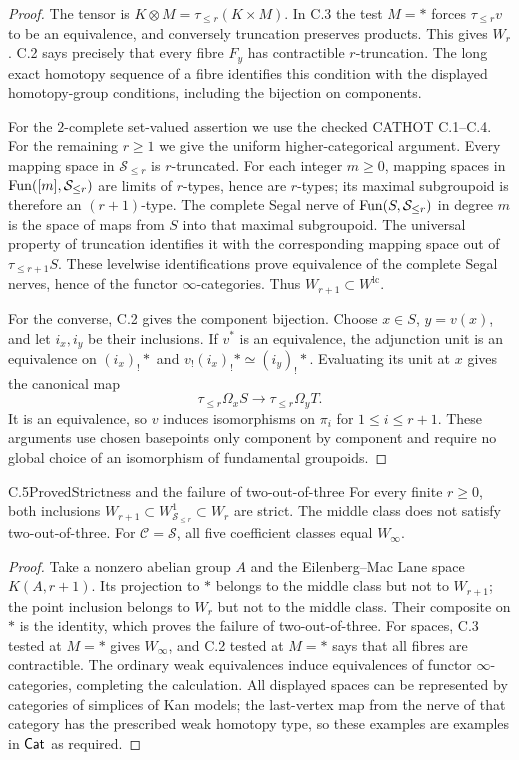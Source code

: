 \begin{proof}
The tensor is $K\otimes M=\tau_{\leq r}(K\times M)$.  In C.3 the test $M=*$ forces $\tau_{\leq r}v$ to be an equivalence, and conversely truncation preserves products.  This gives $W_r$.  C.2 says precisely that every fibre $F_y$ has contractible $r$-truncation.  The long exact homotopy sequence of a fibre identifies this condition with the displayed homotopy-group conditions, including the bijection on components.

For the $2$-complete set-valued assertion we use the checked CATHOT C.1--C.4.  For the remaining $r\geq1$ we give the uniform higher-categorical argument.  Every mapping space in $\mathcal S_{\leq r}$ is $r$-truncated.  For each integer $m\geq0$, mapping spaces in $\operatorname{Fun}([m],\mathcal S_{\leq r})$ are limits of $r$-types, hence are $r$-types; its maximal subgroupoid is therefore an $(r+1)$-type.  The complete Segal nerve of $\operatorname{Fun}(S,\mathcal S_{\leq r})$ in degree $m$ is the space of maps from $S$ into that maximal subgroupoid.  The universal property of truncation identifies it with the corresponding mapping space out of $\tau_{\leq r+1}S$.  These levelwise identifications prove equivalence of the complete Segal nerves, hence of the functor $\infty$-categories.  Thus $W_{r+1}\subset W^{\mathrm{lc}}$.

For the converse, C.2 gives the component bijection.  Choose $x\in S$, $y=v(x)$, and let $i_x,i_y$ be their inclusions.  If $v^*$ is an equivalence, the adjunction unit is an equivalence on $(i_x)_!*$ and $v_!(i_x)_!*\simeq(i_y)_!*$.  Evaluating its unit at $x$ gives the canonical map
\[
 \tau_{\leq r}\Omega_xS\longrightarrow\tau_{\leq r}\Omega_yT.
\]
It is an equivalence, so $v$ induces isomorphisms on $\pi_i$ for $1\leq i\leq r+1$.  These arguments use chosen basepoints only component by component and require no global choice of an isomorphism of fundamental groupoids.
\end{proof}

\begin{claim}{C.5}{Proved}{Strictness and the failure of two-out-of-three}
For every finite $r\geq0$, both inclusions $W_{r+1}\subset W_{\mathcal S_{\leq r}}^1\subset W_r$ are strict.  The middle class does not satisfy two-out-of-three.  For $\mathcal C=\mathcal S$, all five coefficient classes equal $W_\infty$.
\end{claim}
\begin{proof}
Take a nonzero abelian group $A$ and the Eilenberg--Mac Lane space $K(A,r+1)$.  Its projection to $*$ belongs to the middle class but not to $W_{r+1}$; the point inclusion belongs to $W_r$ but not to the middle class.  Their composite on $*$ is the identity, which proves the failure of two-out-of-three.  For spaces, C.3 tested at $M=*$ gives $W_\infty$, and C.2 tested at $M=*$ says that all fibres are contractible.  The ordinary weak equivalences induce equivalences of functor $\infty$-categories, completing the calculation.  All displayed spaces can be represented by categories of simplices of Kan models; the last-vertex map from the nerve of that category has the prescribed weak homotopy type, so these examples are examples in $\mathsf{Cat}$ as required.
\end{proof}

